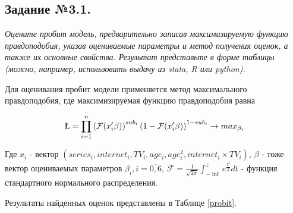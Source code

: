 \documentclass[a4paper,12pt]{article}
\begin{document}
	\subsection{Задание №3.1.}
	\textit{
		Оцените пробит модель, предварительно записав максимизируемую функцию правдоподобия, указав оцениваемые параметры и метод получения оценок, а также их основные свойства. Результат представьте в форме таблицы (можно, например, использовать выдачу из stata, R или python). }

	
	\vspace{0.2cm}
	
	Для оценивания пробит модели применяется метод максимального правдоподобия, где максимизируемая функцию правдоподобия равна
	
	\begin{align*}
		\L = \prod_{i=1}^{n}\left(\mathcal{F} (x_i'\beta)\right)^{sub_i} \left(1-\mathcal{F} (x_i'\beta)\right)^{1-sub_i} \rightarrow max_{\beta_i}
	\end{align*}
	
	 Где $x_i$ - вектор  $(series_i, internet_i, TV_i, age_i, age_i^2, internet_i\times TV_i)$, $\beta$ - тоже вектор оцениваемых параметров $\beta_i, i = \overline{0, 6}$, $\mathcal{F} = \frac{1}{\sqrt{2\pi}}\int_{-\inf}^z e^{\frac{t^2}{2}}dt$ - функция стандартного нормального распределения. 

	\vspace{0.2cm}
	
	Результаты найденных оценок представлены в Таблице \ref{probit}.
	
\end{document}
